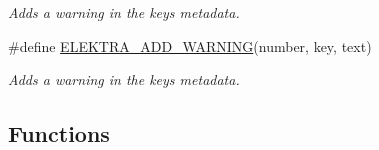 \begin{DoxyCompactItemize}
\begin{DoxyCompactList}\small\item\em Adds a warning in the keys metadata. \end{DoxyCompactList}\item 
\#define \hyperlink{group__plugin_ga3da3bdb0f41710adda9eee3d7adac9ff}{E\+L\+E\+K\+T\+R\+A\+\_\+\+A\+D\+D\+\_\+\+W\+A\+R\+N\+I\+N\+G}(number, key, text)
\begin{DoxyCompactList}\small\item\em Adds a warning in the keys metadata. \end{DoxyCompactList}\end{DoxyCompactItemize}
\subsection*{Functions}
